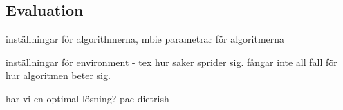 \subsection{Evaluation }
inställningar för algorithmerna, mbie parametrar för algoritmerna

inställningar för environment - tex hur saker sprider sig. fångar inte all fall för hur algoritmen beter sig.

har vi en optimal lösning? pac-dietrish


